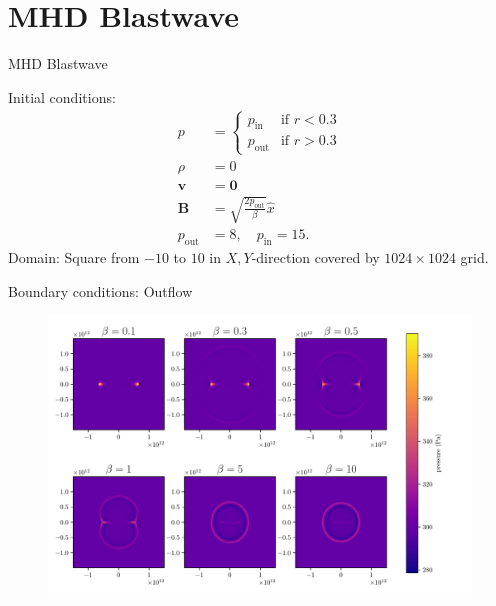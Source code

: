 \documentclass{beamer}
\begin{document}
\section{MHD Blastwave}
\begin{frame}{MHD Blastwave}

Initial conditions:
\begin{align*}
	p &= \begin{cases}
		p_\text{in} & \text{if } r < 0.3\\
		p_\text{out} & \text{if } r > 0.3
	\end{cases} \\
	\rho &= 0 \\
	\mathbf v &=  \mathbf 0 \\
	\mathbf B &= \sqrt{\frac{2 p_\text{out} }{\beta}} \hat{x}\\
	p_\text{out}  &= 8, \quad p_\text{in}  = 15
.\end{align*}
Domain: Square from $-10$ to $10$ in $ X, Y$-direction covered by $1024\times 1024$ grid.

Boundary conditions: Outflow
\end{frame}
\begin{frame}
	\begin{figure}[h]
		\centering
		\includegraphics[width=1.1\textwidth]{figures/influence_beta.pdf}
	\end{figure}
\end{frame}
\end{document}
